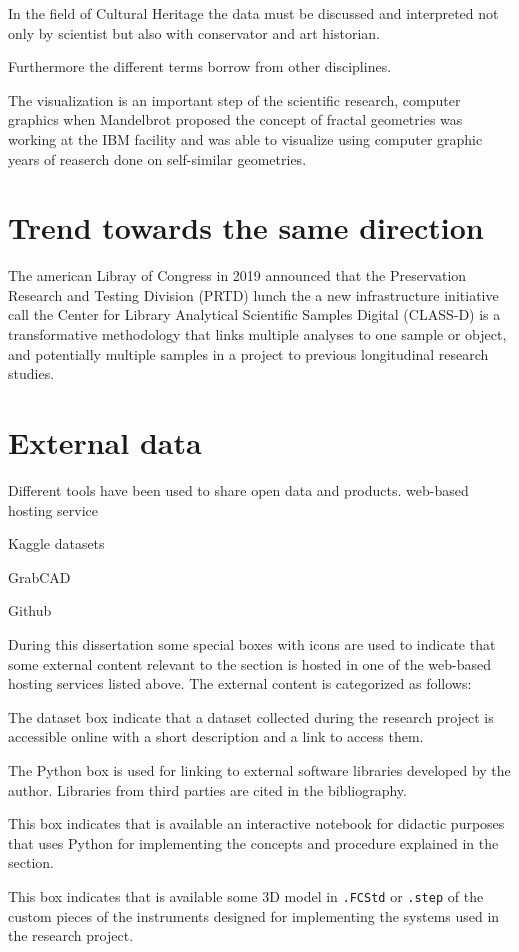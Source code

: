 In the field of Cultural Heritage the data must be discussed and interpreted not only by scientist but also with conservator and art historian.

Furthermore the different terms borrow from other disciplines.

The visualization is an important step of the scientific research, computer graphics when Mandelbrot proposed the concept of fractal geometries was working at the IBM facility and was able to visualize using computer graphic years of reaserch done on self-similar geometries.


\section*{Trend towards the same direction}
The american Libray of Congress in 2019 announced that the
Preservation Research and Testing Division (PRTD) lunch the a new infrastructure initiative call the Center for Library Analytical Scientific Samples Digital (CLASS-D) is a transformative methodology that links multiple analyses to one sample or object, and potentially multiple samples in a project to previous longitudinal research studies.

\section*{External data}
Different tools have been used to share open data and products. 
web-based hosting service

Kaggle datasets 

GrabCAD

Github

During this dissertation some special boxes with icons are used to indicate that some external content relevant to the section is hosted in one of the web-based hosting services listed above. The external content is categorized as follows:
\begin{datasetexc}
The dataset box indicate that a dataset collected during the research project is accessible online with a short description and a link to access them.
\end{datasetexc}
\begin{pythonexc}
The Python box is used for linking to external software libraries developed by the author. Libraries from third parties are cited in the bibliography.   
\end{pythonexc}
\begin{jupyterexc}
This box indicates that is available an interactive notebook for didactic purposes that uses Python for implementing the concepts and procedure explained in the section.
\end{jupyterexc}
\begin{freecadexc}
This box indicates that is available some 3D model in \texttt{.FCStd} or \texttt{.step} of the custom pieces of the instruments designed for implementing the systems used in the research project. 
\end{freecadexc}

